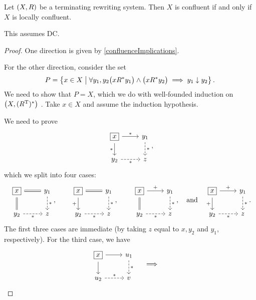 \begin{proposition}
Let $\left( X,R \right)$ be a terminating rewriting system. Then $X$ is confluent \textup{if and only if} $X$ is locally confluent.
\end{proposition}
This assumes DC.
\begin{proof}
One direction is given by \ref{confluenceImplications}.

For the other direction, consider the set
\[ P  = \left\{ x\in X \;\middle|\; \forall y_1,y_2 \big(xR^*y_1\big)\land\big(xR^*y_2\big) \implies y_1\mathrel{\downarrow} y_2 \right\}. \]
We need to show that $P = X$, which we do with well-founded induction on $\left( X,(R^{\mathrm{T}})^* \right)$ . Take $x\in X$ and assume the induction hypothesis.

We need to prove
\[ \begin{tikzcd}
\boxed{x} \arrow[r, "{*}"] \arrow[d, swap, "{*}"] & y_1 \arrow[d, dashed, "{*}"] \\
y_2 \arrow[r, swap, dashed, "{*}"] & {z}
\end{tikzcd}, \]
which we split into four cases:
\[ \begin{tikzcd}
\boxed{x} \arrow[r, equal] \arrow[d, swap, equal] & y_1 \arrow[d, dashed, "{*}"] \\
y_2 \arrow[r, swap, dashed, "{*}"] & {z}
\end{tikzcd}, \qquad \begin{tikzcd}
\boxed{x} \arrow[r, equal] \arrow[d, swap, "{+}"] & y_1 \arrow[d, dashed, "{*}"] \\
y_2 \arrow[r, swap, dashed, "{*}"] & {z}
\end{tikzcd}, \qquad \begin{tikzcd}
\boxed{x} \arrow[r, "{+}"] \arrow[d, equal] & y_1 \arrow[d, dashed, "{*}"] \\
y_2 \arrow[r, swap, dashed, "{*}"] & {z}
\end{tikzcd}, \quad\text{and}\quad \begin{tikzcd}
\boxed{x} \arrow[r, "{+}"] \arrow[d, swap, "{+}"] & y_1 \arrow[d, dashed, "{*}"] \\
y_2 \arrow[r, swap, dashed, "{*}"] & {z}
\end{tikzcd}. \]
The first three cases are immediate (by taking $z$ equal to $x, y_2$ and $y_1$, respectively). For the third case, we have
\[ \begin{tikzcd}
\boxed{x} \rar \dar & u_1 \arrow[d, dashed, "{*}"] \\
u_2 \arrow[r, dashed, "{*}"] & v
\end{tikzcd} \quad\implies\quad \begin{tikzcd}

\end{tikzcd}\]
\end{proof}
